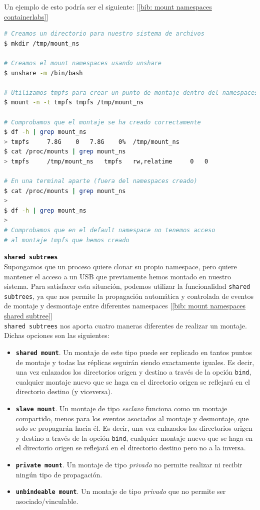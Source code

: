 \documentclass[a4paper, oneside, 12pt]{book}
\begin{document}
	\noindent Un ejemplo de esto podría ser el siguiente: [\ref{bib: mount namespaces containerlabs}]
	\begin{lstlisting}[language=bash, caption={Uso de \texttt{mount namespaces} con ``tmpfs''}]
# Creamos un directorio para nuestro sistema de archivos
$ mkdir /tmp/mount_ns

# Creamos el mount namespaces usando unshare
$ unshare -m /bin/bash

# Utilizamos tmpfs para crear un punto de montaje dentro del namespaces
$ mount -n -t tmpfs tmpfs /tmp/mount_ns

# Comprobamos que el montaje se ha creado correctamente
$ df -h | grep mount_ns
> tmpfs		7.8G	0	7.8G	0%	/tmp/mount_ns
$ cat /proc/mounts | grep mount_ns
> tmpfs		/tmp/mount_ns	tmpfs	rw,relatime		0	0

# En una terminal aparte (fuera del namespaces creado)
$ cat /proc/mounts | grep mount_ns
>
$ df -h | grep mount_ns
>
# Comprobamos que en el default namespace no tenemos acceso 
# al montaje tmpfs que hemos creado
	\end{lstlisting}
	
	\pagebreak
	
	\noindent \textbf{\large \texttt{shared subtrees}}\\
	
	\noindent Supongamos que un proceso quiere clonar su propio namespace, pero quiere mantener el acceso a un USB que previamente hemos montado en nuestro sistema. Para satisfacer esta situación, podemos utilizar la funcionalidad \texttt{shared subtrees}, ya que nos permite la propagación automática y controlada de eventos de montaje y desmontaje entre diferentes namespaces [\ref{bib: mount namespaces shared subtree}] \\
	
	\noindent \texttt{shared subtrees} nos aporta cuatro maneras diferentes de realizar un montaje. Dichas opciones son las siguientes:
	\begin{itemize}
		\item \textbf{\texttt{shared mount}}. Un montaje de este tipo puede ser replicado en tantos puntos de montaje y todas las réplicas seguirán siendo exactamente iguales. Es decir, una vez enlazados los directorios origen y destino a través de la opción \texttt{bind}, cualquier montaje nuevo que se haga en el directorio origen se reflejará en el directorio destino (y viceversa).
		\item \textbf{\texttt{slave mount}}. Un montaje de tipo \textit{esclavo} funciona como un montaje compartido, menos para los eventos asociados al montaje y desmontaje, que solo se propagarán hacia él. Es decir, una vez enlazados los directorios origen y destino a través de la opción \texttt{bind}, cualquier montaje nuevo que se haga en el directorio origen se reflejará en el directorio destino pero no a la inversa.
		\item \textbf{\texttt{private mount}}. Un montaje de tipo \textit{privado} no permite realizar ni recibir ningún tipo de propagación.
		\item \textbf{\texttt{unbindeable mount}}. Un montaje de tipo \textit{privado} que no permite ser asociado/vinculable.
	\end{itemize}
\end{document}
